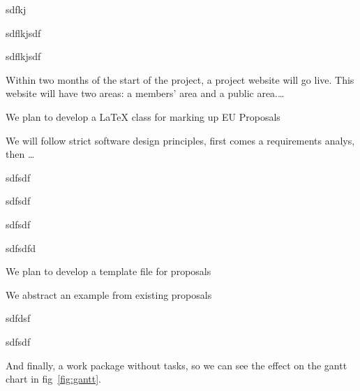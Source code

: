 \begin{workplan}
\begin{workpackage}[id=dissem,title=Dissemination and Exploitation,
RM=8]
 \begin{tasklist}
  \begin{task}[id=t1,wphases=6-7]
    sdfkj
  \end{task}
  \begin{task}[id=t2,wphases=12-13]
    sdflkjsdf
  \end{task}
  \begin{task}[id=t3,wphases=18-19]
    sdflkjsdf
  \end{task}
 \begin{task}[id=t4,wphases=22-24] 
 \end{task}
\end{tasklist}

Within two months of the start of the project, a project website will go live. This
website will have two areas: a members' area and a public area.\ldots
\end{workpackage}
 

\begin{workpackage}[id=class,
   title=A LaTeX class for EU Proposals,short=Class,
  RM=12,RAM=8]
We plan to develop a {\LaTeX} class for marking up EU Proposals

We will follow strict software design principles, first comes a
requirements analys, then \ldots
\begin{tasklist}
  \begin{task}[id=c1,wphases=0-2]
    sdfsdf
  \end{task}
  \begin{task}[id=c2,wphases=4-8]
    sdfsdf
  \end{task}
  \begin{task}[id=c3,wphases=10-14]
    sdfsdf
  \end{task}
  \begin{task}[id=c4,wphases=20-24]
    sdfsdfd
  \end{task}
\end{tasklist}
\end{workpackage} 

\begin{workpackage}[id=temple,title= Proposal Template,
  short=Template,RM=12]

We plan to develop a template file for {\pn} proposals

We abstract an example from existing proposals
\begin{tasklist}
  \begin{task}[id=temple1,wphases=6-12]
    sdfdsf 
  \end{task}
  \begin{task}[id=temple2,wphases=18-24]%
    sdfsdf
  \end{task} 
\end{tasklist}
\end{workpackage}

\begin{workpackage}[id=workphase,title=A work package without tasks,
  wphases=0-4!.5]
  And finally, a work package without tasks, so we can see the effect on the gantt chart
  in fig~\ref{fig:gantt}.
\end{workpackage}
\end{workplan} 

